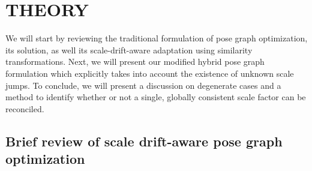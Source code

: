 \documentclass[letterpaper, 10 pt, conference]{ieeeconf}  %
\begin{document}
\section{THEORY}
\label{sec:theory}

We will start by reviewing the traditional formulation of pose graph optimization, its solution, as well its scale-drift-aware adaptation using similarity transformations. Next, we will present our modified hybrid pose graph formulation which explicitly takes into account the existence of unknown scale jumps. To conclude, we will present a discussion on degenerate cases and a method to identify whether or not a single, globally consistent scale factor can be reconciled.

\subsection{Brief review of scale drift-aware pose graph optimization}
\end{document}
